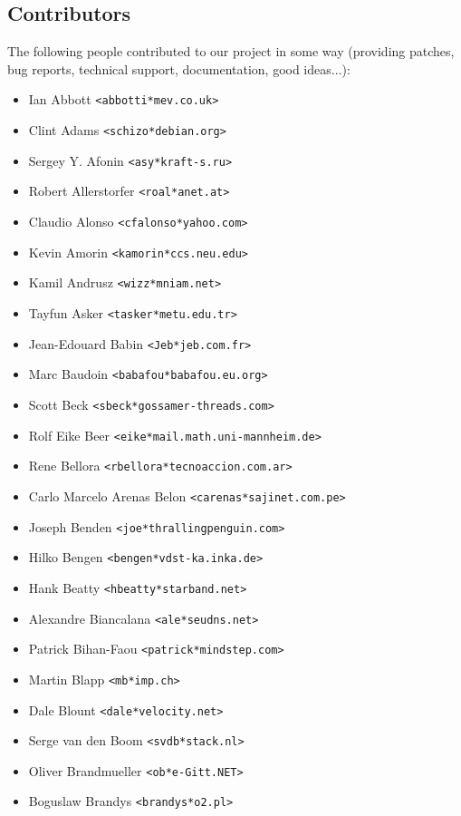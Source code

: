 \documentclass[a4paper,titlepage,12pt]{article}
\newcommand{\email}[1]{\texttt{#1}}
\begin{document}
    \subsection{Contributors}
    The following people contributed to our project in some way (providing
    patches, bug reports, technical support, documentation, good ideas...):
    \begin{itemize}
	\item Ian Abbott \email{<abbotti*mev.co.uk>}
	\item Clint Adams \email{<schizo*debian.org>}
	\item Sergey Y. Afonin \email{<asy*kraft-s.ru>}
	\item Robert Allerstorfer \email{<roal*anet.at>}
	\item Claudio Alonso \email{<cfalonso*yahoo.com>}
	\item Kevin Amorin \email{<kamorin*ccs.neu.edu>}
	\item Kamil Andrusz \email{<wizz*mniam.net>}
	\item Tayfun Asker \email{<tasker*metu.edu.tr>}
	\item Jean-Edouard Babin \email{<Jeb*jeb.com.fr>}
	\item Marc Baudoin \email{<babafou*babafou.eu.org>}
	\item Scott Beck \email{<sbeck*gossamer-threads.com>}
	\item Rolf Eike Beer \email{<eike*mail.math.uni-mannheim.de>}
	\item Rene Bellora \email{<rbellora*tecnoaccion.com.ar>}
	\item Carlo Marcelo Arenas Belon \email{<carenas*sajinet.com.pe>}
	\item Joseph Benden \email{<joe*thrallingpenguin.com>}
	\item Hilko Bengen \email{<bengen*vdst-ka.inka.de>}
	\item Hank Beatty \email{<hbeatty*starband.net>}
	\item Alexandre Biancalana \email{<ale*seudns.net>}
	\item Patrick Bihan-Faou \email{<patrick*mindstep.com>}
	\item Martin Blapp \email{<mb*imp.ch>}
	\item Dale Blount \email{<dale*velocity.net>}
	\item Serge van den Boom \email{<svdb*stack.nl>}
	\item Oliver Brandmueller \email{<ob*e-Gitt.NET>}
	\item Boguslaw Brandys \email{<brandys*o2.pl>}

\end{itemize}
\end{document}
